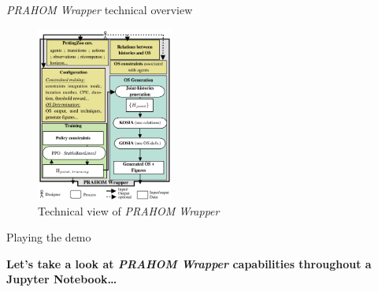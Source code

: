 \documentclass[9pt, aspectratio=169]{beamer}
\begin{document}
\begin{frame}{\emph{PRAHOM Wrapper} technical overview}

\begin{figure}[h!]
    \centering
    \includegraphics[width=0.4\textwidth]{technical_view.png}
    \caption{Technical view of \emph{PRAHOM Wrapper}}
    \label{fig:pw_technical_view}
\end{figure}

\end{frame}

\begin{frame}{Playing the demo}
    
    \textbf{Let's take a look at \emph{PRAHOM Wrapper} capabilities throughout a Jupyter Notebook\dots}

\end{frame}

\end{document}
